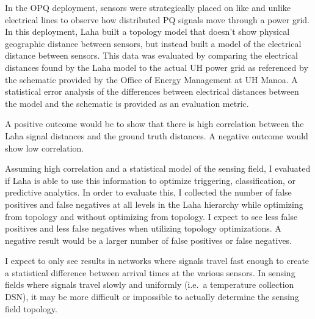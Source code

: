 In the OPQ deployment, sensors were strategically placed on like and unlike electrical lines to observe how distributed PQ signals move through a power grid. In this deployment, Laha built a topology model that doesn't show physical geographic distance between sensors, but instead built a model of the electrical distance between sensors. This data was evaluated by comparing the electrical distances found by the Laha model to the actual UH power grid as referenced by the schematic provided by the Office of Energy Management at UH Manoa. A statistical error analysis of the differences between electrical distances between the model and the schematic is provided as an evaluation metric.

A positive outcome would be to show that there is high correlation between the Laha signal distances and the ground truth distances. A negative outcome would show low correlation.

Assuming high correlation and a statistical model of the sensing field, I evaluated if Laha is able to use this information to optimize triggering, classification, or predictive analytics. In order to evaluate this, I collected the number of false positives and false negatives at all levels in the Laha hierarchy while optimizing from topology and without optimizing from topology. I expect to see less false positives and less false negatives when utilizing topology optimizations. A negative result would be a larger number of false positives or false negatives.

I expect to only see results in networks where signals travel fast enough to create a statistical difference between arrival times at the various sensors. In sensing fields where signals travel slowly and uniformly (i.e.\ a temperature collection DSN), it may be more difficult or impossible to actually determine the sensing field topology.
